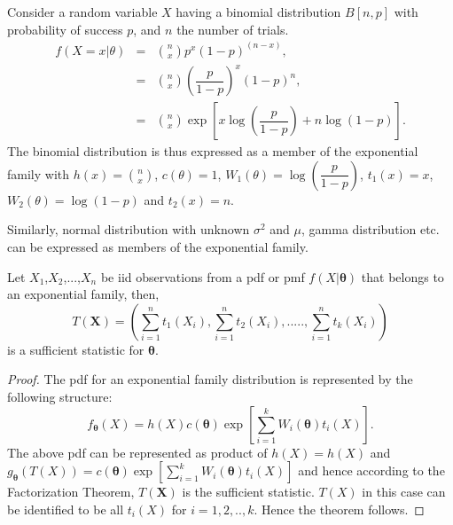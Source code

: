 \documentclass[a4paper,english,12pt]{article}
\newcommand{\bX}{\mathbf{X}}
\newcommand{\btheta}{\boldsymbol{\theta}}
\begin{document}
\begin{exmp}
\par Consider a random variable $X$ having a binomial distribution $B[n,p]$ with probability of success $p$, and $n$ the number of trials. 
\begin{eqnarray}
f(X=x|\theta) &=& \binom{n}{x}p^{x}(1-p)^{(n-x)},\nonumber \\
&=& \binom{n}{x}\left(\dfrac{p}{1-p}\right)^x(1-p)^n,\nonumber \\
&=& \binom{n}{x}\exp\left[x \log\left(\dfrac{p}{1-p}\right) + n \log(1-p)\right].
\end{eqnarray}
 The binomial distribution is thus expressed as a member of the exponential family with $h(x) = \binom{n}{x}$, $c(\theta) = 1$, $W_1(\theta) = \log\left(\dfrac{p}{1-p}\right)$, $t_1(x) = x$, $W_2(\theta) = \log(1-p)$ and $t_2(x) = n$.
\end {exmp}
Similarly, normal distribution with unknown $\sigma^2$ and $\mu$, gamma distribution etc. can be expressed as members of the exponential family.
\begin{thm}
Let $X_1$,$X_2$,...,$X_n$ be iid observations from a pdf or pmf $f(X|\btheta)$ that belongs to an exponential family, then, 
\begin{equation}
T(\bX) = \left(\sum_{i=1}^{n}t_1(X_i), \sum_{i=1}^{n}t_2(X_i),.....,\sum_{i=1}^{n}t_k(X_i)\right)
\end{equation}
is a sufficient statistic for $\btheta$.
\end{thm}
\begin{proof}
The pdf for an exponential family distribution is represented by the following structure:
\begin{equation}
f_{\btheta}(X) = h(X)c(\btheta)\exp\left[\sum_{i=1}^{k} W_i(\btheta)t_i(X)\right].
\end{equation}
The above pdf can be represented as product of $h(X) = h(X)$ and $g_{\btheta}(T(X)) = c(\btheta)\exp\left[\sum_{i=1}^{k} W_i(\btheta)t_i(X)\right]$ and hence according to the Factorization Theorem, $T(\bX)$ is the sufficient statistic. $T(X)$ in this case can be identified to be all $t_i(X)$ for $i=1,2,..,k$. Hence the theorem follows.
\end{proof}
\end{document}

